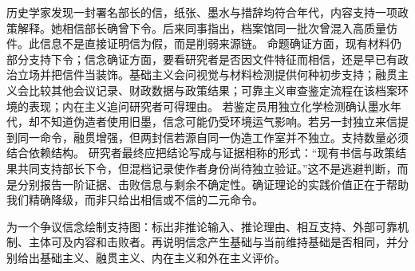 历史学家发现一封署名部长的信，纸张、墨水与措辞均符合年代，内容支持一项政策解释。她相信部长确曾下令。后来同事指出，档案馆同一批次曾混入高质量仿件。此信息不是直接证明信为假，而是削弱来源链。 命题确证方面，现有材料仍部分支持下令；信念确证方面，要看研究者是否因文件特征而相信，还是早已有政治立场并把信件当装饰。基础主义会问视觉与材料检测提供何种初步支持；融贯主义会比较其他会议记录、财政数据与政策结果；可靠主义审查鉴定流程在该档案环境的表现；内在主义追问研究者可得理由。 若鉴定员用独立化学检测确认墨水年代，却不知道伪造者使用旧墨，信念可能仍受环境运气影响。若另一封独立来信提到同一命令，融贯增强，但两封信若源自同一伪造工作室并不独立。支持数量必须结合依赖结构。 研究者最终应把结论写成与证据相称的形式：“现有书信与政策结果共同支持部长下令，但混档记录使作者身份尚待独立验证。”这不是逃避判断，而是分别报告一阶证据、击败信息与剩余不确定性。确证理论的实践价值正在于帮助我们精确降级，而非只给出相信或不信的二元命令。

\begin{tcolorbox}[breakable,colback=white,colframe=blue!30!black,title={本章研读任务},fonttitle=\bfseries]
为一个争议信念绘制支持图：标出非推论输入、推论理由、相互支持、外部可靠机制、主体可及内容和击败者。再说明信念产生基础与当前维持基础是否相同，并分别给出基础主义、融贯主义、内在主义和外在主义评价。
\end{tcolorbox}
